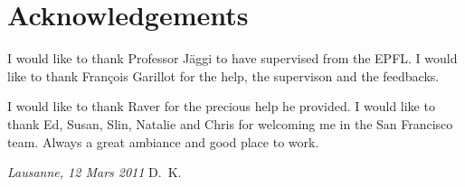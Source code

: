 \chapter*{Acknowledgements}
I would like to thank Professor Jäggi to have supervised from the EPFL.
I would like to thank François Garillot for the help, the supervison and the feedbacks.

I would like to thank Raver for the precious help he provided.
I would like to thank Ed, Susan, Slin, Natalie and Chris for welcoming me in the San Francisco team. Always a great ambiance and good place to work. 
\bigskip
 
\noindent\textit{Lausanne, 12 Mars 2011}
\hfill D.~K.
